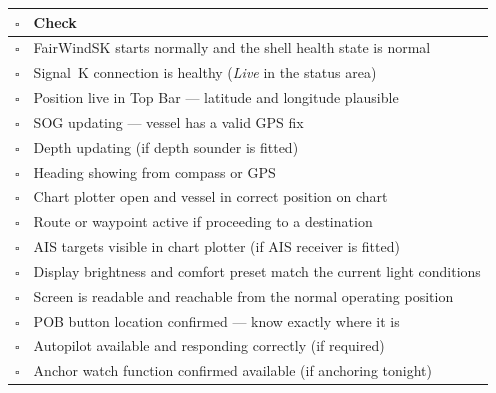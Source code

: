 \begin{longtable}{C{0.8cm}L{12.9cm}}
\toprule
{}
\color{white}\sffamily\bfseries $\square$ &
\color{white}\sffamily\bfseries Check \\
\midrule
$\square$ & FairWindSK starts normally and the shell health state is normal \\
$\square$ & Signal~K connection is healthy (\textit{Live} in the status area) \\
$\square$ & Position live in Top Bar --- latitude and longitude plausible \\
$\square$ & SOG updating --- vessel has a valid GPS fix \\
$\square$ & Depth updating (if depth sounder is fitted) \\
$\square$ & Heading showing from compass or GPS \\
$\square$ & Chart plotter open and vessel in correct position on chart \\
$\square$ & Route or waypoint active if proceeding to a destination \\
$\square$ & AIS targets visible in chart plotter (if AIS receiver is fitted) \\
$\square$ & Display brightness and comfort preset match the current light conditions \\
$\square$ & Screen is readable and reachable from the normal operating position \\
$\square$ & POB button location confirmed --- know exactly where it is \\
$\square$ & Autopilot available and responding correctly (if required) \\
$\square$ & Anchor watch function confirmed available (if anchoring tonight) \\
\bottomrule
\end{longtable}
